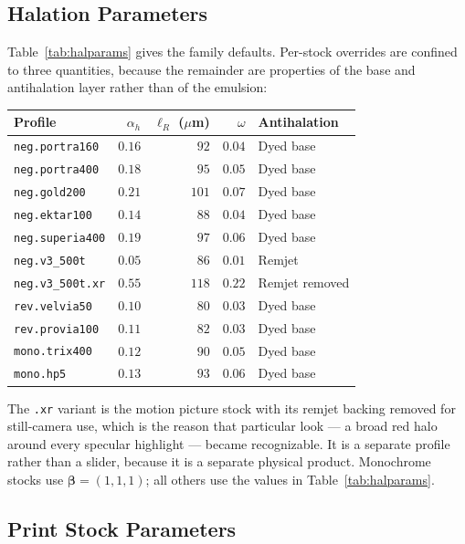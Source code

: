 \subsection{Halation Parameters}

Table~\ref{tab:halparams} gives the family defaults. Per-stock overrides are
confined to three quantities, because the remainder are properties of the base
and antihalation layer rather than of the emulsion:

\begin{center}
\renewcommand{\arraystretch}{1.1}
\footnotesize
\begin{tabular}{@{}lrrrl@{}}
\toprule
\textbf{Profile} & $\alpha_h$ & $\ell_R$ ($\mu$m) & $\omega$ & \textbf{Antihalation} \\
\midrule
\texttt{neg.portra160}  & $0.16$ & $92$  & $0.04$ & Dyed base \\
\texttt{neg.portra400}  & $0.18$ & $95$  & $0.05$ & Dyed base \\
\texttt{neg.gold200}    & $0.21$ & $101$ & $0.07$ & Dyed base \\
\texttt{neg.ektar100}   & $0.14$ & $88$  & $0.04$ & Dyed base \\
\texttt{neg.superia400} & $0.19$ & $97$  & $0.06$ & Dyed base \\
\texttt{neg.v3\_500t}   & $0.05$ & $86$  & $0.01$ & Remjet \\
\texttt{neg.v3\_500t.xr}& $0.55$ & $118$ & $0.22$ & Remjet removed \\
\texttt{rev.velvia50}   & $0.10$ & $80$  & $0.03$ & Dyed base \\
\texttt{rev.provia100}  & $0.11$ & $82$  & $0.03$ & Dyed base \\
\texttt{mono.trix400}   & $0.12$ & $90$  & $0.05$ & Dyed base \\
\texttt{mono.hp5}       & $0.13$ & $93$  & $0.06$ & Dyed base \\
\bottomrule
\end{tabular}
\end{center}

\noindent The \texttt{.xr} variant is the motion picture stock with its remjet
backing removed for still-camera use, which is the reason that particular look
--- a broad red halo around every specular highlight --- became recognizable.
It is a separate profile rather than a slider, because it is a separate
physical product. Monochrome stocks use $\boldsymbol{\beta} = (1,1,1)$; all
others use the values in Table~\ref{tab:halparams}.

\subsection{Print Stock Parameters}

